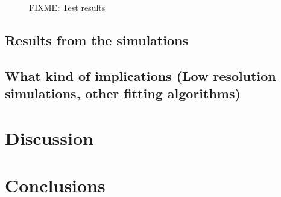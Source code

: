 \documentclass[useAMS,usenatbib]{mn2e}
\begin{document}
\begin{figure}[H]
\caption{FIXME: Test results}
\end{figure}



\subsection{Results from the simulations}


\subsection{What kind of implications (Low resolution simulations, other fitting
algorithms)} 


\section{Discussion}
\label{sec:discussion}


\section{Conclusions}
\label{sec:conclusions}




\end{document}
